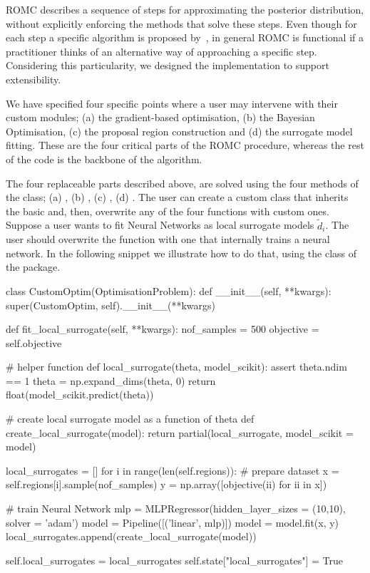 ROMC describes a sequence of steps for approximating the posterior
distribution, without explicitly enforcing the methods that solve
these steps. Even though for each step a specific algorithm is
proposed by~\cite{Ikonomov2019}, in general ROMC is functional if a
practitioner thinks of an alternative way of approaching a specific
step. Considering this particularity, we designed the implementation
to support extensibility.

We have specified four specific points where a user may intervene with
their custom modules; (a) the gradient-based optimisation, (b) the
Bayesian Optimisation, (c) the proposal region construction and (d)
the surrogate model fitting. These are the four critical parts of the
ROMC procedure, whereas the rest of the code is the backbone of the
algorithm.

The four replaceable parts described above, are solved using the four
methods of the \linebreak {} class; (a)
, (b) ,
\linebreak (c) , (d)
. The user can create a custom
class that inherits the basic  and, then,
overwrite any of the four functions with custom ones. Suppose a user
wants to fit Neural Networks as local surrogate models
\(\tilde{d}_i\). The user should overwrite the
 function with one that internally
trains a neural network. In the following snippet we illustrate how to
do that, using the  class of the
 package.

\begin{Code}
class CustomOptim(OptimisationProblem):
    def __init__(self, **kwargs):
        super(CustomOptim, self).__init__(**kwargs)

    def fit_local_surrogate(self, **kwargs):
        nof_samples = 500
        objective = self.objective

        # helper function
        def local_surrogate(theta, model_scikit):
            assert theta.ndim == 1
            theta = np.expand_dims(theta, 0)
            return float(model_scikit.predict(theta))

        # create local surrogate model as a function of theta
        def create_local_surrogate(model):
            return partial(local_surrogate, model_scikit = model)

        local_surrogates = []
        for i in range(len(self.regions)):
            # prepare dataset
            x = self.regions[i].sample(nof_samples)
            y = np.array([objective(ii) for ii in x])

            # train Neural Network
            mlp = MLPRegressor(hidden_layer_sizes = (10,10), solver = 'adam')
            model = Pipeline([('linear', mlp)])
            model = model.fit(x, y)
            local_surrogates.append(create_local_surrogate(model))

        self.local_surrogates = local_surrogates
        self.state["local_surrogates"] = True
\end{Code}

